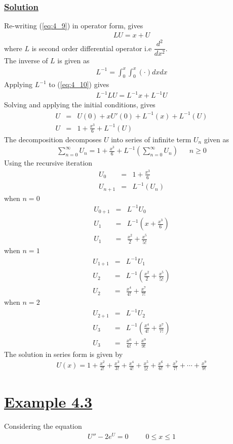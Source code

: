 \documentclass[11pt]{report}
\newcommand{\ubt}[1]{\textbf{\underline{#1}}}
\newcommand{\sps}{\\[0.2cm]}
\newcommand{\refn}[1]{(\ref{#1})}
\newcommand{\refx}[1]{\refn{eq:#1}}
\newcommand{\dsp}{\displaystyle}
\newcommand{\sprime}{'}
\newcommand{\dprime}{''}
\newcommand{\example}[1]{\section*{\ubt{Example #1}}}
\newcommand{\solution}{\subsubsection{\ubt{Solution}}}
\begin{document}
	\solution
	Re-writing \refx{4_9} in operator form, gives
	\begin{eqnarray}
		LU = x+U\label{eq:4_10}
	\end{eqnarray}
	where $L$ is second order differential operator i.e $\dsp\dfrac{d^2}{dx^2}$. \\
	The inverse of $L$ is given as
	\begin{eqnarray}
		L^{-1} = \int_0^x\int_0^x(\cdot)dxdx
	\end{eqnarray}
	Applying $L^{-1}$ to \refx{4_10} gives
	\begin{eqnarray}
		L^{-1}LU = L^{-1}x + L^{-1}U
	\end{eqnarray}
	Solving and applying the initial conditions, gives
	\begin{eqnarray}
		U &=&U(0) + xU\sprime(0) + L^{-1}(x) + L^{-1}(U)\sps
		U &=& 1 + \frac{x^3}{6} + L^{-1}(U)\label{eq:4_14}
	\end{eqnarray}
	The decomposition decomposes $U$ into series of infinite term $U_n$ given as
	\begin{eqnarray}
		\sum_{n=0}^{\infty}U_n = 1 + \frac{x^3}{6}+ L^{-1}\left(\sum_{n=0}^\infty U_n\right)~~~~~~~ n \geq 0
	\end{eqnarray}
	Using the recursive iteration
	\begin{eqnarray*}
		U_0 &=& 1 + \frac{x^3}{6}\sps
		U_{n+1} &=& L^{-1}(U_n)
	\end{eqnarray*}
	when $n=0$
	\begin{eqnarray*}
		U_{0+1} & =& L^{-1} U_0\sps
		U_1 &=& L^{-1}\left(x + \frac{x^3}{6}\right)\sps
		U_1 &=& \frac{x^2}{2} + \frac{x^5}{5!}
	\end{eqnarray*}
	when $n=1$
	\begin{eqnarray*}
		U_{1+1} & =& L^{-1}U_1\sps
		U_2 &=& L^{-1}\left(\frac{x^2}{2}+\frac{x^5}{5!}\right)\sps
		U_2 &=& \frac{x^4}{4!} + \frac{x^7}{7!}
	\end{eqnarray*}
	when $n=2$
	\begin{eqnarray*}
		U_{2+1} &=& L^{-1}U_2\sps
		U_3 &=& L^{-1}\left(\frac{x^4}{4!}+ \frac{x^7}{7!}\right)\sps
		U_3 &=& \frac{x^6}{6!} + \frac{x^9}{9!}
	\end{eqnarray*}
	The solution in series form is given by 
	\begin{eqnarray*}
		U(x) = 1 + \frac{x^2}{2!} + \frac{x^3}{3!} + \frac{x^4}{4!} + \frac{x^5}{5!} + \frac{x^6}{6!} + \frac{x^7}{7!} + \cdots + \frac{x^9}{9!}
	\end{eqnarray*}
	\newpage
	\example{4.3}
	Considering the equation 
	\begin{eqnarray}
		U\dprime - 2e^U = 0 ~~~~~~~~~~~ 0 \leq x \leq 1\label{eq:4_16}
	\end{eqnarray}
\end{document}
